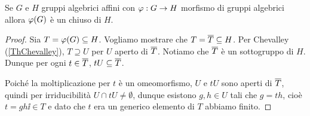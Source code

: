 \begin{proposition}
Se $G$ e $H$ gruppi algebrici affini con $\varphi:G\to H$ morfismo di gruppi algebrici allora $\varphi(G)$ \`e un chiuso di $H$.
\end{proposition}
\begin{proof}
Sia $T=\varphi(G)\subseteq H$. Vogliamo mostrare che $T=\overline{T}\subseteq H$. Per Chevalley (\ref{ThChevalley}), $T\supseteq U$ per $U$ aperto di $\overline{T}$. Notiamo che $\overline{T}$ \`e un sottogruppo di $H$. Dunque per ogni $t\in \overline{T}$, $tU\subseteq \overline{T}$.

Poich\'e la moltiplicazione per $t$ \`e un omeomorfismo, $U$ e $tU$ sono aperti di $\overline{T}$, quindi per irriducibilit\`a $U\cap tU\neq \emptyset$, dunque esistono $g,h\in U$ tali che $g=th$, cio\`e $t=gh\ii\in T$ e dato che $t$ era un generico elemento di $T$ abbiamo finito.
\end{proof}

